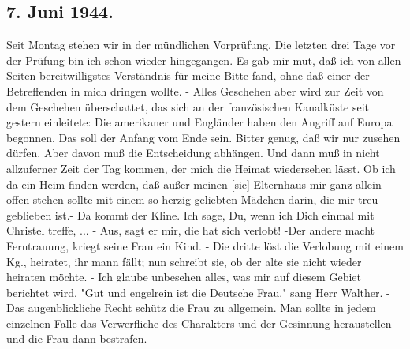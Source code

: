 \subsection{7. Juni 1944.}

Seit Montag stehen wir in der m\"{u}ndlichen Vorpr\"{u}fung.
Die letzten drei Tage vor der Pr\"{u}fung bin ich schon wieder hingegangen.
Es gab mir mut, da{\ss} ich von allen Seiten bereitwilligstes Verst\"{a}ndnis f\"{u}r meine Bitte fand, ohne da{\ss} einer der Betreffenden in mich dringen wollte.
- Alles Geschehen aber wird zur Zeit von dem Geschehen \"{u}berschattet, das sich an der franz\"{o}sischen Kanalk\"{u}ste seit gestern einleitete: Die amerikaner und Engl\"{a}nder haben den Angriff auf Europa begonnen.
Das soll der Anfang vom Ende sein.
Bitter genug, da{\ss} wir nur zusehen d\"{u}rfen.
Aber davon mu{\ss} die Entscheidung abh\"{a}ngen.
Und dann mu{\ss} in nicht allzuferner Zeit der Tag kommen, der mich die Heimat wiedersehen l\"{a}sst.
Ob ich da ein Heim finden werden, da{\ss} au{\ss}er meinen{\color{red} [sic] } Elternhaus mir ganz allein offen stehen sollte mit einem so herzig geliebten M\"{a}dchen darin, die mir treu geblieben ist.-
Da kommt der Kline.
Ich sage, Du, wenn ich Dich einmal mit Christel treffe, ... - Aus, sagt er mir, die hat sich verlobt!
-Der andere macht Ferntrauung, kriegt seine Frau ein Kind.
- Die dritte l\"{o}st die Verlobung mit einem Kg., heiratet, ihr mann f\"{a}llt; nun schreibt sie, ob der alte sie nicht wieder heiraten m\"{o}chte.
- Ich glaube unbesehen alles, was mir auf diesem Gebiet berichtet wird.
"Gut und engelrein ist die Deutsche Frau." sang Herr Walther.
- Das augenblickliche Recht sch\"{u}tz die Frau zu allgemein.
Man sollte in jedem einzelnen Falle das Verwerfliche des Charakters und der Gesinnung heraustellen und die Frau dann bestrafen.


\clearpage
